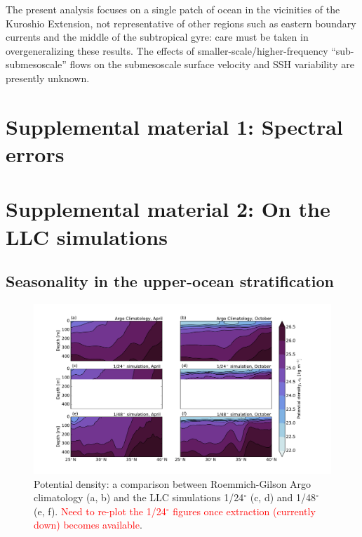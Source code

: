 \documentclass[grl]{agutex2015}
\begin{document}
\begin{article}
The present analysis focuses on a single patch of ocean in the
vicinities of the Kuroshio Extension, not
representative of other regions such as eastern boundary currents
and the middle of the subtropical gyre: care must be taken in overgeneralizing
these results.  The effects of smaller-scale/higher-frequency
``sub-submesoscale'' flows on the submesoscale surface velocity and SSH variability
are presently unknown.

\clearpage

\appendix

\section{Supplemental material 1: Spectral errors}

\section{Supplemental material 2: On the LLC simulations}

\subsection{Seasonality in the upper-ocean stratification}

\begin{figure}[ht]
   \begin{center}
     \includegraphics[width=1.\textwidth]{figs/fig_s2_1.pdf}
  \caption{Potential density: a comparison between Roemmich-Gilson Argo
          climatology (a, b) and the LLC simulations 1/24$^\circ$ (c, d)
          and  1/48$^\circ$ (e, f). \textcolor{red}{Need to re-plot  the 1/24$^\circ$
          figures once extraction (currently down) becomes available}.}
  \label{figS2_1}
  \end{center}
\end{figure}


\end{article}
\end{document}
